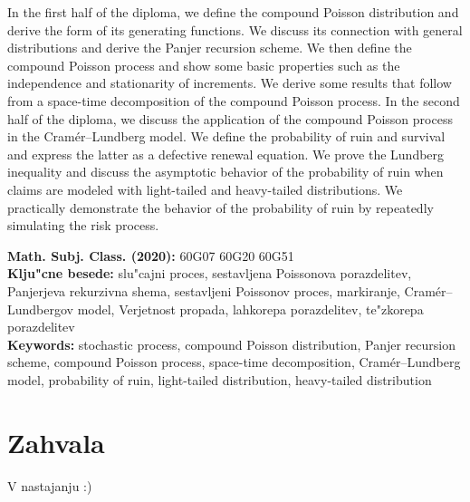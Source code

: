 \documentclass[12pt, a4paper, reqno]{amsart}
\theoremstyle{definition}
\theoremstyle{plain}
\newcommand{\1}{\mathds{1}}
\begin{document}
In the first half of the diploma, we define the compound Poisson distribution and derive the form of its
generating functions. We discuss its connection with general distributions and derive the Panjer recursion scheme.
We then define the compound Poisson process and show some basic properties such as the independence and
stationarity of increments. We derive some results that follow from a space-time decomposition of the compound Poisson process.
In the second half of the diploma, we discuss the application of the compound Poisson process in the Cramér--Lundberg model. 
We define the probability of ruin and survival and express the latter as a defective renewal equation. 
We prove the Lundberg inequality and discuss the asymptotic behavior of the probability of ruin when 
claims are modeled with light-tailed and heavy-tailed distributions. We practically demonstrate the behavior 
of the probability of ruin by repeatedly simulating the risk process.


\vfill\noindent
{\bf Math. Subj. Class. (2020):} 60G07 60G20 60G51 \\[1mm]
{\bf Klju"cne besede:} slu"cajni proces, sestavljena Poissonova porazdelitev, Panjerjeva rekurzivna shema, 
sestavljeni Poissonov proces, markiranje,
 Cramér--Lundbergov model, Verjetnost propada, lahkorepa porazdelitev, te"zkorepa porazdelitev\\[1mm]
{\bf Keywords:} stochastic process, compound Poisson distribution, Panjer recursion scheme, 
compound Poisson process, space-time decomposition,
Cramér--Lundberg model, probability of ruin, light-tailed distribution, heavy-tailed distribution
\pagebreak


\section*{Zahvala}
V nastajanju :) 
%
%
\pagebreak
\end{document}
